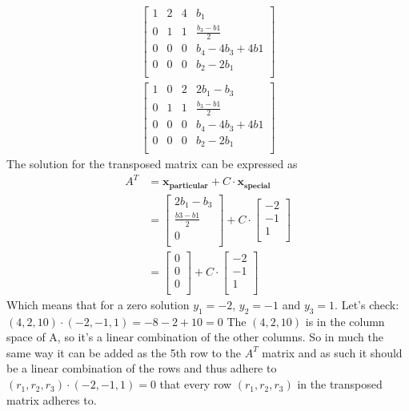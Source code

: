 \documentclass[a4paper,11pt]{article}
\newcommand{\mybf}[1]{\boldsymbol{#1}}
\begin{document}
\begin{align}
\left[
\begin{array}{ccc|c}
1 & 2 & 4 & b_1 \\
0 & 1 & 1 & \frac{b_3-b1}{2} \\
0 & 0 & 0 & b_4-4b_3+4b1 \\
0 & 0 & 0 & b_2-2b_1\\
\end{array}
\right]
\end{align}
\begin{align}
\left[
\begin{array}{ccc|c}
1 & 0 & 2 & 2b_1-b_3 \\
0 & 1 & 1 & \frac{b_3-b1}{2} \\
0 & 0 & 0 & b_4-4b_3+4b1 \\
0 & 0 & 0 & b_2-2b_1\\
\end{array}
\right]
\end{align}
The solution for the transposed matrix can be expressed as
\begin{align}
A^T 
&= \mybf{x_{particular}} + C \cdot \mybf{x_{special}} \\
&=
\begin{bmatrix}
2b_1-b_3 \\
\frac{b3-b1}{2} \\
0 \\
\end{bmatrix}
+ C \cdot 
\begin{bmatrix}
-2 \\
-1 \\
1 \\
\end{bmatrix} \\
&=
\begin{bmatrix}
0 \\
0 \\
0 \\
\end{bmatrix}
+ C \cdot 
\begin{bmatrix}
-2 \\
-1 \\
1 \\
\end{bmatrix}
\end{align}
Which means that for a zero solution $y_1=-2$, $y_2=-1$ and $y_3=1$.
Let's check:
$(4,2,10) \cdot (-2, -1, 1) = -8 -2 + 10 = 0$
The $(4,2,10)$ is in the column space of A, so it's a linear combination of the other columns. So in much the same way it can be added as the 5th row to the $A^T$ matrix and as such it should be a linear combination of the rows and thus adhere to $(r_1,r_2,r_3) \cdot (-2, -1, 1) = 0$ that every row $(r_1, r_2, r_3)$ in the transposed matrix adheres to.
\end{document}
